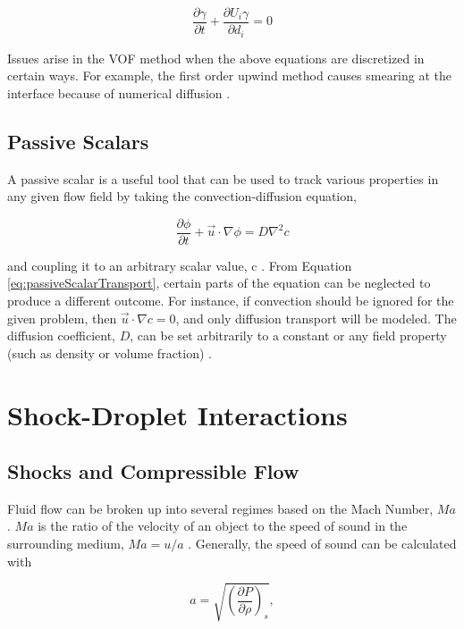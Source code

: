 \documentclass{UCF_ETD}
\begin{document}
\begin{equation}
    \frac{\partial\gamma}{\partial t}+\frac{\partial U_i\gamma}{\partial d_i}=0
    \label{eq:VOFTransportdiffeq}
\end{equation}

Issues arise in the VOF method when the above equations are discretized in certain ways. For example, the first order upwind method causes smearing at the interface because of numerical diffusion \cite{GOPALA2008204}.

\subsection{Passive Scalars}
A passive scalar is a useful tool that can be used to track various properties in any given flow field by taking the convection-diffusion equation,

\begin{equation}
    \frac{\partial \phi}{\partial t} + \vec{u} \cdot \nabla \phi=D \nabla^{2} c
    \label{eq:passiveScalarTransport}
\end{equation}

\noindent and coupling it to an arbitrary scalar value, c \cite{Kirby_2010}. From Equation \ref{eq:passiveScalarTransport}, certain parts of the equation can be neglected to produce a different outcome. For instance, if convection should be ignored for the given problem, then $\vec{u} \cdot \nabla c =0$, and only diffusion transport will be modeled. The diffusion coefficient, $D$, can be set arbitrarily to a constant or any field property (such as density or volume fraction) \cite{Kirby_2010, starccm}.

\section{Shock-Droplet Interactions}
\label{sec:shockDropBackground}

\subsection{Shocks and Compressible Flow}

Fluid flow can be broken up into several regimes based on the Mach Number, $Ma$. $Ma$ is the ratio of the velocity of an object to the speed of sound in the surrounding medium, $Ma = u/a$ \cite{GasDynamics}. Generally, the speed of sound can be calculated with

\begin{equation}
    a = \sqrt{\left(\frac{\partial P}{\partial \rho}\right)_{s}},
    \label{eq:sound_speed}
\end{equation}
\end{document}
